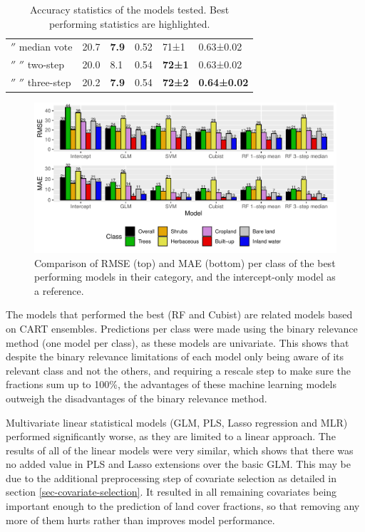 \documentclass[review,authoryear,3p]{elsarticle}
\begin{document}
\begin{table}
\begin{tabular}{llllll}
\ensuremath{''} median vote
& 20.7  & \textbf{7.9}   & 0.52  & 71±1  & 0.63±0.02 \\
\ensuremath{''} \ensuremath{''} two-step
& 20.0  & 8.1   & 0.54  & \textbf{72±1}  & 0.63±0.02 \\
\ensuremath{''} \ensuremath{''} three-step
& 20.2  & \textbf{7.9}   & 0.54  & \textbf{72±2}  & \textbf{0.64±0.02} \\
\bottomrule
\end{tabular}
\caption{Accuracy statistics of the models tested. Best performing statistics are highlighted.}
\label{tab-accuracy}
\end{table}

\begin{figure}
    \includegraphics[width=\textwidth]{article/article-figures/barplots/2020-06-03-model-comparison-bar}
    \caption{Comparison of \gls{RMSE} (top) and \gls{MAE} (bottom) per class of the best performing models in their category, and the intercept-only model as a reference.}
    \label{fig-models}
\end{figure}

The models that performed the best (\gls{RF} and Cubist) are related models based on \gls{CART} ensembles.
Predictions per class were made using the binary relevance method (one model per class), as these models are univariate.
This shows that despite the binary relevance limitations of each model only being aware of its relevant class and not the others, and requiring a rescale step to make sure the fractions sum up to 100\%, the advantages of these machine learning models outweigh the disadvantages of the binary relevance method.

Multivariate linear statistical models (\gls{GLM}, \gls{PLS}, Lasso regression and \gls{MLR}) performed significantly worse, as they are limited to a linear approach.
The results of all of the linear models were very similar, which shows that there was no added value in \gls{PLS} and Lasso extensions over the basic \gls{GLM}.
This may be due to the additional preprocessing step of covariate selection as detailed in section \ref{sec-covariate-selection}.
It resulted in all remaining covariates being important enough to the prediction of land cover fractions, so that removing any more of them hurts rather than improves model performance.
\end{document}
